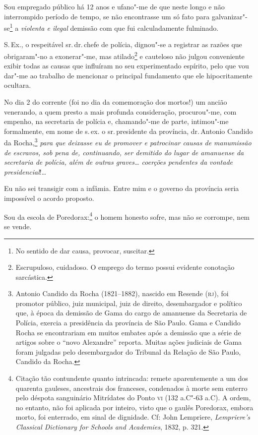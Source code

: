 Sou empregado público há 12 anos e ufano"-me de que neste longo e não
interrompido período de tempo, se não encontrasse um só fato para
galvanizar"-se\footnote{No sentido de dar causa, provocar, suscitar.} a
\emph{violenta e ilegal} demissão com que fui calculadamente fulminado.

S.\,Ex., o respeitável sr.\,dr.\,chefe de polícia, dignou"-se a registrar as
razões que obrigaram"-no a exonerar"-me, mas atilado\footnote{
  Escrupuloso, cuidadoso. O emprego do termo possui evidente conotação
  sarcástica.} e cauteloso não julgou conveniente exibir todas as causas
que influíram no seu experimentado espírito, pelo que vou dar"-me ao
trabalho de mencionar o principal fundamento que ele hipocritamente
ocultara.

No dia 2 do corrente (foi no dia da comemoração dos mortos!) um ancião
venerando, a quem presto a mais profunda consideração, procurou"-me, com
empenho, na secretaria de polícia e, chamando"-me de parte, intimou"-me
formalmente, em nome de s.\,ex. o sr.\,presidente da província, dr.\,Antonio Candido da Rocha,\footnote{Antonio Candido da Rocha
  (1821--1882), nascido em Resende (\textsc{rj}), foi promotor público, juiz
  municipal, juiz de direito, desembargador e político que, à época da
  demissão de Gama do cargo de amanuense da Secretaria de Polícia,
  exercia a presidência da província de São Paulo. Gama e Candido Rocha
  se encontrariam em muitos embates após a demissão que a série de
  artigos sobre o ``novo Alexandre'' reporta. Muitas ações judiciais de
  Gama foram julgadas pelo desembargador do Tribunal da Relação de São
  Paulo, Candido da Rocha.} \emph{para que deixasse eu de promover e
patrocinar causas de manumissão de escravos, sob pena de, continuando,
ser demitido do lugar de amanuense da secretaria de polícia, além de
outras graves\ldots{} coerções pendentes da vontade presidencial}!\ldots{}

Eu não sei transigir com a infâmia. Entre mim e o governo da província
seria impossível o acordo proposto.

Sou da escola de Poredorax:\footnote{Citação tão contundente quanto
  intrincada: remete aparentemente a um dos quarenta gauleses,
  ancestrais dos franceses, condenados à morte sem enterro pelo déspota
  sanguinário Mitrídates do Ponto \textsc{vi} (132 a.C"-63 a.C). A ordem, no
  entanto, não foi aplicada por inteiro, visto que o gaulês Poredorax,
  embora morto, foi enterrado, em sinal de dignidade. Cf: John
  Lempriere, \emph{Lempriere's Classical Dictionary for Schools and
  Academies}, 1832, p. 321.} o homem honesto sofre, mas não se
corrompe, nem se vende.

